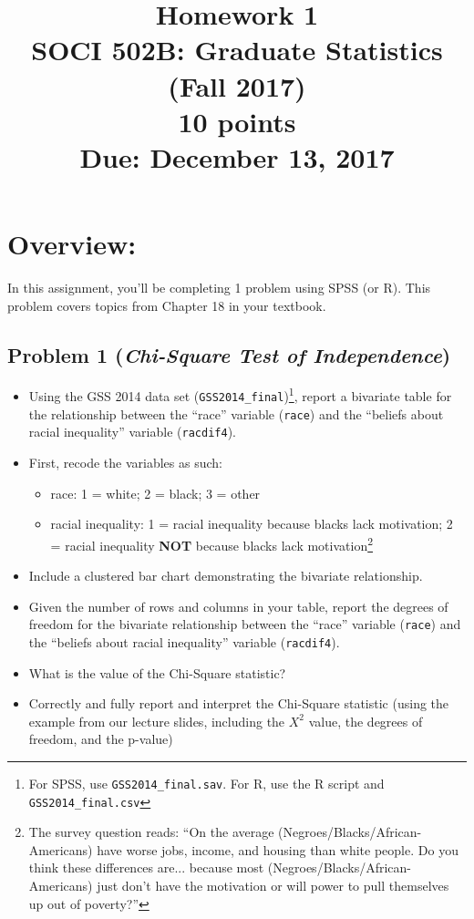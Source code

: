 \documentclass{article}
\begin{document}
\title{Homework 1\\ SOCI 502B: Graduate Statistics (Fall 2017) \\ {\large{10 points}} \\ {\large{Due: December 13, 2017}}}
\author[*]{}
\date{}
\maketitle



\section*{Overview:}
In this assignment, you'll be completing 1 problem using SPSS (or R). This problem covers topics from Chapter 18 in your textbook.

\subsection*{Problem 1 (\textit{Chi-Square Test of Independence})}
\begin{itemize}
\item Using the GSS 2014 data set (\texttt{GSS2014\_final})\footnote{For SPSS, use \texttt{GSS2014\_final.sav}. For R, use the R script and \texttt{GSS2014\_final.csv}}, report a bivariate table for the relationship between the ``race'' variable (\texttt{race}) and the ``beliefs about racial inequality'' variable (\texttt{racdif4}).
\item First, recode the variables as such:
\begin{itemize}
\item race: 1 = white; 2 = black; 3 = other
\item racial inequality: 1 = racial inequality because blacks lack motivation; 2 = racial inequality \textbf{NOT} because blacks lack motivation\footnote{The survey question reads: ``On the average (Negroes/Blacks/African-Americans) have worse jobs, income, and housing than white people. Do you think these differences are... because most (Negroes/Blacks/African-Americans) just don't have the motivation or will power to pull themselves up out of poverty?''}
\end{itemize}
\item Include a clustered bar chart demonstrating the bivariate relationship.
\item Given the number of rows and columns in your table, report the degrees of freedom for the bivariate relationship between the ``race'' variable (\texttt{race}) and the ``beliefs about racial inequality'' variable (\texttt{racdif4}). 
\item What is the value of the Chi-Square statistic? 
\item Correctly and fully report and interpret the Chi-Square statistic (using the example from our lecture slides, including the $X^2$ value, the degrees of freedom, and the p-value)
\end{itemize}
\end{document}
